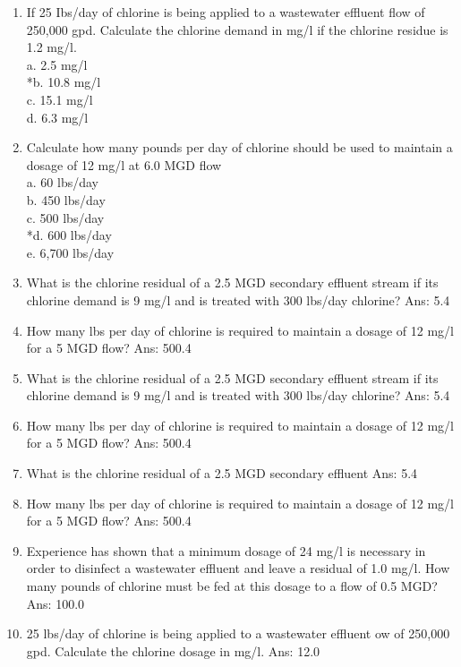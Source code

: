 \begin{enumerate}
\item If 25 Ibs/day of chlorine is being applied to a wastewater effluent flow of 250,000 gpd. Calculate the chlorine demand in mg/l if the chlorine residue is 1.2 mg/l. \\
a. 2.5 mg/l \\
*b. 10.8 mg/l \\
c. 15.1 mg/l \\
d. 6.3 mg/l \\
\item Calculate how many pounds per day of chlorine should be used to maintain a dosage of 12 mg/l at 6.0 MGD flow \\
a. 60 lbs/day \\
b. 450 lbs/day \\
c. 500 lbs/day \\
*d. 600 lbs/day \\
e. 6,700 lbs/day \\
\item What is the chlorine residual of a 2.5 MGD secondary effluent stream if its chlorine demand is 9 mg/l and is treated with 300 lbs/day chlorine?   Ans:  5.4
\\
\item How many lbs per day of chlorine is required to maintain a dosage of 12 mg/l for a 5 MGD flow?   Ans:  500.4
\\
\item What is the chlorine residual of a 2.5 MGD secondary effluent stream if its chlorine demand is 9 mg/l and is treated with 300 lbs/day chlorine? Ans:  5.4
\\
\item How many lbs per day of chlorine is required to maintain a dosage of 12 mg/l for a 5 MGD flow?  Ans:  500.4
\\
\item What is the chlorine residual of a 2.5 MGD secondary effluent  Ans:  5.4
\\
\item How many lbs per day of chlorine is required to maintain a dosage of 12 mg/l for a 5 MGD flow? Ans:  500.4
\\
\item Experience has shown that a minimum dosage of 24 mg/l is necessary in order to disinfect a wastewater effluent and leave a residual of 1.0 mg/l. How many pounds of chlorine must be fed at this dosage to a flow of 0.5 MGD? Ans:  100.0
\\
\item 25 lbs/day of chlorine is being applied to a wastewater effluent ow of 250,000 gpd. Calculate the chlorine dosage in mg/l.  Ans:  12.0

\end{enumerate}
